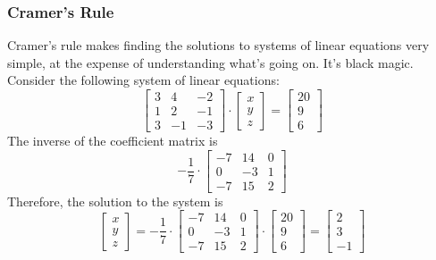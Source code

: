\documentclass[xcolor=dvipsnames]{beamer}
\begin{document}
\begin{frame}
  \frametitle{Cramer's Rule}
  Cramer's rule makes finding the solutions to systems of linear
  equations very simple, at the expense of understanding what's going
  on. It's black magic. Consider the following system of linear
  equations:
  \begin{equation}
    \label{eq:keiyikae}
    \left[
      \begin{array}{ccc}
        3 & 4 & -2 \\
        1 & 2 & -1 \\
        3 & -1 & -3
      \end{array}\right]\cdot\left[
      \begin{array}{c}
        x \\
        y \\
        z
      \end{array}\right]=\left[
      \begin{array}{c}
        20 \\
        9 \\
        6
      \end{array}\right]
  \end{equation}
  The inverse of the coefficient matrix is
  \begin{equation}
    \label{eq:phiedier}
    -\frac{1}{7}\cdot\left[
      \begin{array}{ccc}
        -7 & 14 & 0 \\
        0 & -3 & 1 \\
        -7 & 15 & 2
      \end{array}\right]
  \end{equation}
  Therefore, the solution to the system is
  \begin{equation}
    \label{eq:suchociw}
    \left[
      \begin{array}{c}
        x \\
        y \\
        z
      \end{array}\right]=-\frac{1}{7}\cdot\left[
      \begin{array}{ccc}
        -7 & 14 & 0 \\
        0 & -3 & 1 \\
        -7 & 15 & 2
      \end{array}\right]\cdot\left[
      \begin{array}{c}
        20 \\
        9 \\
        6
      \end{array}\right]=\left[
      \begin{array}{c}
        2 \\
        3 \\
        -1
      \end{array}\right]
  \end{equation}
\end{frame}
\end{document}
